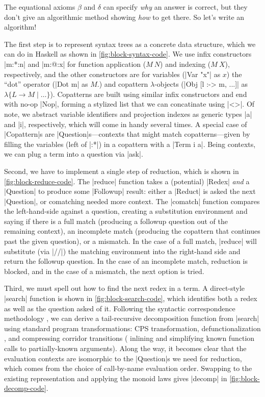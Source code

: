 \documentclass[sigplan,screen]{acmart}
\begin{document}
The equational axioms $\beta$ and $\delta$ can specify \emph{why} an answer is
correct, but they don't give an algorithmic method showing \emph{how} to get
there.  So let's write an algorithm!

The first step is to represent syntax trees as a concrete data structure, which
we can do in Haskell as shown in \cref{fig:block-syntax-code}.  We use infix
constructors \hs|m:*:n| and \hs|m:@:x| for function application ($M~N$) and
indexing ($M~X$), respectively, and the other constructors are for variables
(\hs|Var "x"| as $x$) the ``dot'' operator (\hs|Dot m| as $M.$) and copattern
$\lambda$-objects (\hs|Obj [l :-> m, ...]| as $\lambda\{L \to M \mid \dots\}$).
Copatterns are built using similar infix constructors and end with no-op
\hs|Nop|, forming a stylized list that we can concatinate using \hs|<>|.  Of
note, we abstract variable identifiers and projection indexes as generic types
\hs|a| and \hs|i|, respectively, which will come in handy several times.  A
special case of \hs|Copattern|s are \hs|Question|s---contexts that might match
copatterns---given by filling the variables (left of \hs|:*|) in a copattern
with a \hs|Term i a|.  Being contexts, we can plug a term into a question via
\hs|ask|.

Second, we have to implement a single step of reduction, which is shown in
\cref{fig:block-reduce-code}.  The \hs|reduce| function takes a (potential)
\hs|Redex| \emph{and} a \hs|Question| to produce some \hs|Followup| result:
either a \hs|Reduct| is asked the next \hs|Question|, or comatching needed more
context.  The \hs|comatch| function compares the left-hand-side against a
question, creating a substitution environment and saying if there is a full
match (producing a followup question out of the remaining context), an
incomplete match (producing the copattern that continues past the given
question), or a mismatch.  In the case of a full match, \hs|reduce| will
substitute (via \hs|//|) the matching environment into the right-hand side and
return the followup question.  In the case of an incomplete match, reduction is
blocked, and in the case of a mismatch, the next option is tried.

Third, we must spell out how to find the next redex in a term.  A direct-style
\hs|search| function is shown in \cref{fig:block-search-code}, which identifies
both a redex as well as the question asked of it.  Following the syntactic
correspondence methodology \cite{SyntacticCorrespondence}, we can derive a
tail-recursive decomposition function from \hs|search| using standard program
transformations: CPS transformation, defunctionalization
\cite{DefinitionalInterpreters}, and compressing corridor transitions (\ie
inlining and simplifying known function calls to partially-known arguments).
Along the way, it becomes clear that the evaluation contexts are isomorphic to
the \hs|Question|s we need for reduction, which comes from the choice of
call-by-name evaluation order.  Swapping to the existing representation and
applying the monoid laws gives \hs|decomp| in \cref{fig:block-decomp-code}.
\end{document}

